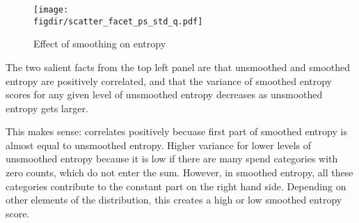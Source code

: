 \begin{figure}[ht]
    \centering 
    \caption{Effect of smoothing on entropy}
    \label{fig:scatter_facets}
    \texttt{[image: \\figdir/scatter\_facet\_ps\_std\_q.pdf]}
\end{figure}






The two salient facts from the top left panel are that unsmoothed and smoothed
entropy are positively correlated, and that the variance of smoothed entropy
scores for any given level of unsmoothed entropy decreases as unsmoothed
entropy gets larger.

This makes sense: correlates positively becuase first part of smoothed entropy
is almost equal to unsmoothed entropy. Higher variance for lower levels of
unsmoothed entropy because it is low if there are many spend categories with zero
counts, which do not enter the sum. However, in smoothed entropy, all these
categories contribute to the constant part on the right hand side. Depending on
other elements of the distribution, this creates a high or low smoothed entropy
score.



